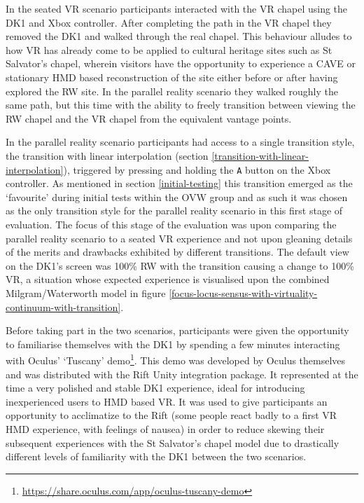 In the seated VR scenario participants interacted with the VR chapel using the DK1 and Xbox controller. After completing the path in the VR chapel they removed the DK1 and walked through the real chapel. This behaviour alludes to how VR has already come to be applied to cultural heritage sites such as St Salvator's chapel, wherein visitors have the opportunity to experience a CAVE or stationary HMD based reconstruction of the site either before or after having explored the RW site. In the parallel reality scenario they walked roughly the same path, but this time with the ability to freely transition between viewing the RW chapel and the VR chapel from the equivalent vantage points.

In the parallel reality scenario participants had access to a single transition style, the transition with linear interpolation (section \ref{transition-with-linear-interpolation}), triggered by pressing and holding the \texttt{A} button on the Xbox controller. As mentioned in section \ref{initial-testing} this transition emerged as the `favourite' during initial tests within the OVW group and as such it was chosen as the only transition style for the parallel reality scenario in this first stage of evaluation. The focus of this stage of the evaluation was upon comparing the parallel reality scenario to a seated VR experience and not upon gleaning details of the merits and drawbacks exhibited by different transitions. The default view on the DK1's screen was 100\% RW with the transition causing a change to 100\% VR, a situation whose expected experience is visualised upon the combined Milgram/Waterworth model in figure \ref{focus-locus-sensus-with-virtuality-continuum-with-transition}.

Before taking part in the two scenarios, participants were given the opportunity to familiarise themselves with the DK1 by spending a few minutes interacting with Oculus' `Tuscany' demo\footnote{\url{https://share.oculus.com/app/oculus-tuscany-demo}}. This demo was developed by Oculus themselves and was distributed with the Rift Unity integration package. It represented at the time a very polished and stable DK1 experience, ideal for introducing inexperienced users to HMD based VR. It was used to give participants an opportunity to acclimatize to the Rift (some people react badly to a first VR HMD experience, with feelings of nausea) in order to reduce skewing their subsequent experiences with the St Salvator's chapel model due to drastically different levels of familiarity with the DK1 between the two scenarios.

